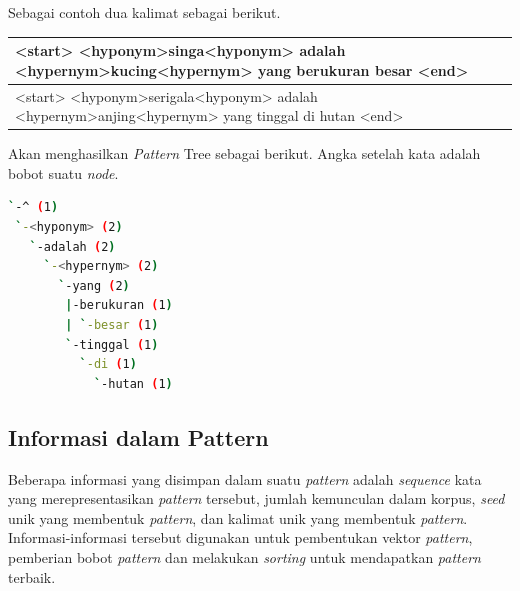 \noindent Sebagai contoh dua kalimat sebagai berikut.
\begin{center}
  \begin{tabular}{ | m{32em} | } 
  \hline
  <start> <hyponym>singa<hyponym> adalah <hypernym>kucing<hypernym> yang berukuran besar <end> \\ \hline
  \hline
  <start> <hyponym>serigala<hyponym> adalah <hypernym>anjing<hypernym> yang tinggal di hutan <end>\\ \hline
  \end{tabular}
\end{center}

\noindent Akan menghasilkan \textit{Pattern} Tree sebagai berikut. Angka setelah kata adalah bobot suatu \textit{node}.

\begin{lstlisting}[caption={Contoh \textit{pattern tree} yang terbentuk}, language=bash]
`-^ (1)
 `-<hyponym> (2)
   `-adalah (2)
     `-<hypernym> (2)
       `-yang (2)
        |-berukuran (1)
        | `-besar (1)
        `-tinggal (1)
          `-di (1)
            `-hutan (1)
\end{lstlisting}

\subsection{Informasi dalam Pattern}
Beberapa informasi yang disimpan dalam suatu \textit{pattern} adalah \textit{sequence} kata yang merepresentasikan \textit{pattern} tersebut, jumlah kemunculan dalam korpus, \textit{seed} unik yang membentuk \textit{pattern}, dan kalimat unik yang membentuk \textit{pattern}. Informasi-informasi tersebut digunakan untuk pembentukan vektor \textit{pattern}, pemberian bobot \textit{pattern} dan melakukan \textit{sorting} untuk mendapatkan \textit{pattern} terbaik.

